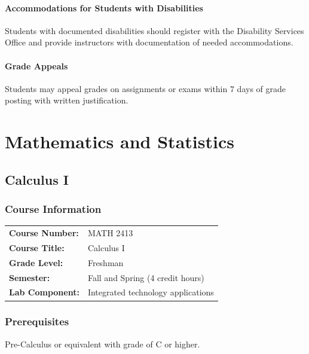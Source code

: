 \documentclass[12pt,oneside]{book}
\begin{document}
\subsection*{Accommodations for Students with Disabilities}

Students with documented disabilities should register with the Disability Services Office and provide instructors with documentation of needed accommodations.

\subsection*{Grade Appeals}

Students may appeal grades on assignments or exams within 7 days of grade posting with written justification.


\part{Mathematics and Statistics}

\chapter{Calculus I}

\section{Course Information}

\begin{tabular}{ll}
\textbf{Course Number:} & MATH 2413 \\
\textbf{Course Title:} & Calculus I \\
\textbf{Grade Level:} & Freshman \\
\textbf{Semester:} & Fall and Spring (4 credit hours) \\
\textbf{Lab Component:} & Integrated technology applications \\
\end{tabular}

\section{Prerequisites}

Pre-Calculus or equivalent with grade of C or higher.
\end{document}
